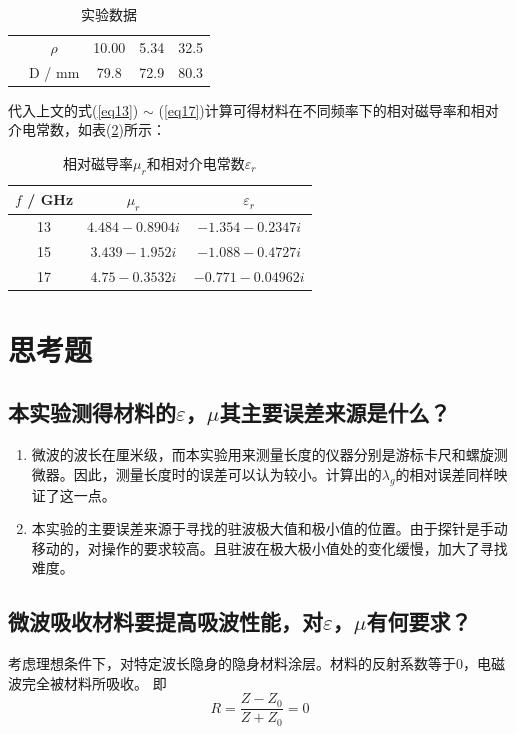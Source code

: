 \documentclass[a4paper]{article}
\begin{document}
\begin{table}[!h]
\begin{tabular}{|c|c|c|c|c|}
		                                                              & \cellcolor[HTML]{EFEFEF}$\rho$ & \cellcolor[HTML]{EFEFEF}10.00 & \cellcolor[HTML]{EFEFEF}5.34  & \cellcolor[HTML]{EFEFEF}32.5 	\\ \cline{2-5}\hhline{~|----|}
		\multirow{-4}{*}{开路}                                        & \cellcolor[HTML]{EFEFEF}D / mm & \cellcolor[HTML]{EFEFEF}79.8  & \cellcolor[HTML]{EFEFEF}72.9  & \cellcolor[HTML]{EFEFEF}80.3	\\ \hline
	\end{tabular}
	\caption{实验数据}\label{table1:data}
\end{table}


代入上文的式(\ref{eq13}) $\sim$ (\ref{eq17})计算可得材料在不同频率下的相对磁导率和相对介电常数，如表(\ref{table2:mu_r and epsilon_r})所示：
\begin{table}[!h]
	\centering
	\begin{tabular}{|c|c|c|}
		\hline
		$f$ / GHz & $\mu_r$             & $\varepsilon_r$     \\ \hline
		13         & $4.484-0.8904i$   & $-1.354-0.2347i$ \\ \hline
		15        & $ 3.439-1.952i$   & $ -1.088-0.4727i$  \\ \hline
		17        & $ 4.75-0.3532i$ & $ -0.771-0.04962i$   \\ \hline
	\end{tabular}
	\caption{相对磁导率$\mu_r$和相对介电常数$\varepsilon_r$}\label{table2:mu_r and epsilon_r}
\end{table}

\section{思考题}
\subsection{本实验测得材料的$\varepsilon$，$\mu$其主要误差来源是什么？}
\begin{enumerate}
	\item 微波的波长在厘米级，而本实验用来测量长度的仪器分别是游标卡尺和螺旋测微器。因此，测量长度时的误差可以认为较小。计算出的$\lambda_g$的相对误差同样映证了这一点。
	\item 本实验的主要误差来源于寻找的驻波极大值和极小值的位置。由于探针是手动移动的，对操作的要求较高。且驻波在极大极小值处的变化缓慢，加大了寻找难度。
\end{enumerate}
\subsection{微波吸收材料要提高吸波性能，对$\varepsilon$，$\mu$有何要求？}
考虑理想条件下，对特定波长隐身的隐身材料涂层。材料的反射系数等于0，电磁波完全被材料所吸收。
即
\begin{equation}
	R =  \frac{Z - Z_0}{Z + Z_0} = 0
\end{equation}
\end{document}
